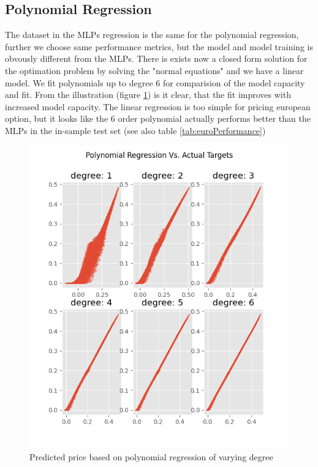 \subsection{Polynomial Regression}
The dataset in the MLPs regression is the same for the polynomial regression, further we choose same performance metrics, but the model and model training is obvously different from the MLPs. There is exists now a closed form solution for the optimation problem by solving the "normal equations" and we have a linear model. We fit polynomials up to degree 6 for comparision of the model capacity and fit. From the illustration (figure \ref{fig:PolynomialEuroC}) is it clear, that the fit improves with increased model capacity. The linear regression is too simple for pricing european option, but it looks like the 6 order polynomial actually performs better than the MLPs in the in-sample test set (see also table \ref{tab:euroPerformance})
\begin{figure}[H]
\centering
\includegraphics{Figures/polynomialEuroC.png}
\decoRule
\caption[Polynomial Regression Predictions Vs. Actual Prices]{Predicted price based on polynomial regression of varying degree}
\label{fig:PolynomialEuroC}
\end{figure}

